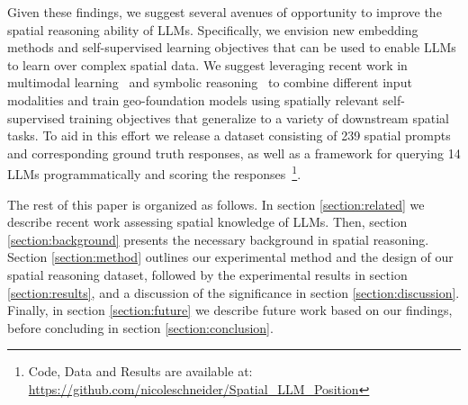 Given these findings, we suggest several avenues of opportunity to improve the spatial reasoning ability of LLMs.
Specifically, we envision new embedding methods and self-supervised learning objectives that can be used to enable LLMs to learn over complex spatial data.
We suggest leveraging recent work in multimodal learning~\cite{Xue2023, Trappolini2023} and symbolic reasoning~\cite{Lee2023} to combine different input modalities and train geo-foundation models using spatially relevant self-supervised training objectives that generalize to a variety of downstream spatial tasks.
To aid in this effort we release a dataset consisting of 239  spatial prompts and corresponding ground truth responses, as well as a framework for querying 14 LLMs programmatically and scoring the responses~\footnote{Code, Data and Results are available at: \url{https://github.com/nicoleschneider/Spatial_LLM_Position}}. 







The rest of this paper is organized as follows.
In section \ref{section:related} we describe recent work assessing spatial knowledge of LLMs.
Then, section \ref{section:background} presents the necessary background in spatial reasoning.
Section \ref{section:method} outlines our experimental method and the design of our spatial reasoning dataset, followed by the experimental results in section \ref{section:results}, and a discussion of the significance in section \ref{section:discussion}.
Finally, in section \ref{section:future} we describe future work based on our findings, before concluding in section \ref{section:conclusion}. 




